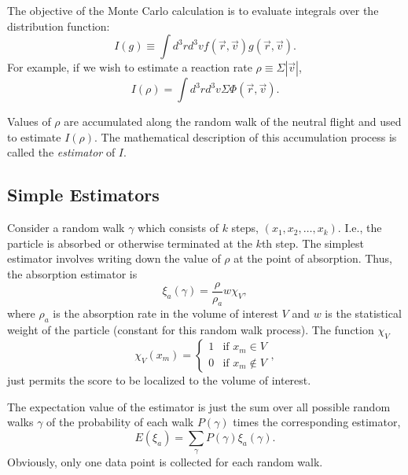 \documentclass[12pt]{report}
\begin{document}
The objective of the Monte Carlo calculation is to evaluate integrals over the
distribution function:
\begin{equation}
I(g) \equiv \int d^{3}r d^{3}v f(\vec{r},\vec{v})
g(\vec{r},\vec{v}).
\label{gestimator}
\end{equation}
For example, if we wish to estimate a reaction rate 
$\rho \equiv \Sigma |\vec{v}|$,
\begin{equation}
I(\rho) = \int d^{3}r d^{3}v \Sigma \Phi(\vec{r},\vec{v}).
\end{equation}

Values of $\rho$ are accumulated along the random walk of the neutral flight
and used to estimate $I(\rho)$. The mathematical description of this
accumulation process is called the {\em estimator} of $I$. 

\subsection{Simple Estimators}
\label{SimpleEstimators}

Consider a random walk $\gamma$ which consists of $k$ steps,
$(x_{1}, x_{2}, \ldots, x_{k})$. I.e., the
particle is absorbed or otherwise terminated at the $k$th step.
The simplest estimator involves writing down the value of $\rho$
at the point of absorption. Thus, the absorption estimator is
\begin{equation}
\xi_{a}(\gamma) = \frac{\rho}{\rho_{a}} w \chi_{V},
\end{equation}
where $\rho_{a}$ is the absorption rate in the volume of interest
$V$ and $w$ is the statistical weight of the particle (constant for
this random walk process). The function $\chi_{V}$
\begin{equation}
\chi_{V} (x_{m}) = \left \{ \begin{array}{ll}
                        1 & \mbox{if $x_{m} \in V$} \\
                        0 & \mbox{if $x_{m} \not\in V$}
                       \end{array}
                         \right.,
\end{equation}
just permits the score to be localized to the volume of interest.

The expectation value of the estimator is just the sum over all
possible random walks $\gamma$ of the probability of each
walk $P(\gamma)$ times the corresponding estimator,
\begin{equation}
E(\xi_{a}) = \sum_{\gamma} P(\gamma) \xi_{a}(\gamma).
\end{equation}
Obviously, only one data point is collected for each random walk.
\end{document}
